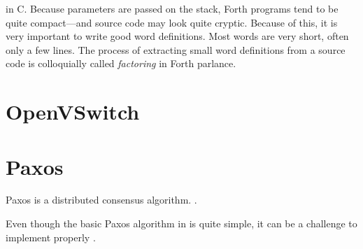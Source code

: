 in C.  Because parameters are passed on the stack, Forth programs tend to be
quite compact---and source code may look quite cryptic.  Because of this, it
is very important to write good word definitions.  Most words are very
short, often only a few lines.  The process of extracting small word
definitions from a source code is colloquially called \textit{factoring} in
Forth parlance.

\section{OpenVSwitch}

\section{Paxos}
Paxos is a distributed consensus algorithm.
.

Even though the basic Paxos algorithm in \cite{Lam01} is quite simple, it can be
a challenge to implement properly \cite{Chandra:2007:PML:1281100.1281103}.

